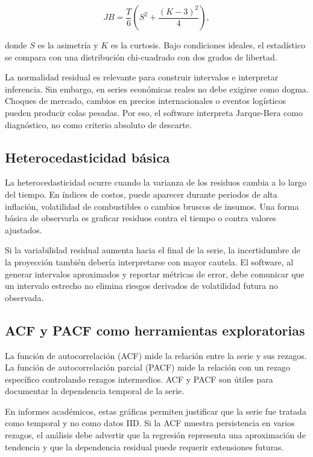 \begin{equation}
    JB = \frac{T}{6}\left(S^2 + \frac{(K-3)^2}{4}\right),
    \label{eq:jarque_bera}
\end{equation}

donde \(S\) es la asimetría y \(K\) es la curtosis. Bajo condiciones ideales, el estadístico se compara con una distribución chi-cuadrado con dos grados de libertad.

La normalidad residual es relevante para construir intervalos e interpretar inferencia. Sin embargo, en series económicas reales no debe exigirse como dogma. Choques de mercado, cambios en precios internacionales o eventos logísticos pueden producir colas pesadas. Por eso, el software interpreta Jarque-Bera como diagnóstico, no como criterio absoluto de descarte.

\subsection{Heterocedasticidad básica}

La heterocedasticidad ocurre cuando la varianza de los residuos cambia a lo largo del tiempo. En índices de costos, puede aparecer durante periodos de alta inflación, volatilidad de combustibles o cambios bruscos de insumos. Una forma básica de observarla es graficar residuos contra el tiempo o contra valores ajustados.

Si la variabilidad residual aumenta hacia el final de la serie, la incertidumbre de la proyección también debería interpretarse con mayor cautela. El software, al generar intervalos aproximados y reportar métricas de error, debe comunicar que un intervalo estrecho no elimina riesgos derivados de volatilidad futura no observada.

\subsection{ACF y PACF como herramientas exploratorias}

La función de autocorrelación (ACF) mide la relación entre la serie y sus rezagos. La función de autocorrelación parcial (PACF) mide la relación con un rezago específico controlando rezagos intermedios. ACF y PACF son útiles para documentar la dependencia temporal de la serie.

En informes académicos, estas gráficas permiten justificar que la serie fue tratada como temporal y no como datos IID. Si la ACF muestra persistencia en varios rezagos, el análisis debe advertir que la regresión representa una aproximación de tendencia y que la dependencia residual puede requerir extensiones futuras.
